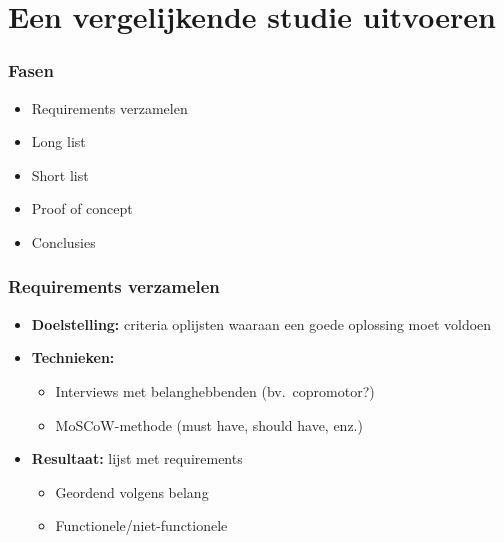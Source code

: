 \documentclass[aspectratio=169]{beamer}
\begin{document}
\section{Een vergelijkende studie uitvoeren}

\begin{frame}
  \frametitle{Fasen}


  \begin{itemize}
    \item Requirements verzamelen
    \item Long list
    \item Short list
    \item Proof of concept
    \item Conclusies
  \end{itemize}

\end{frame}

\begin{frame}
  \frametitle{Requirements verzamelen}

  \begin{itemize}
    \item \textbf{Doelstelling:} criteria oplijsten waaraan een goede oplossing moet voldoen
    \item \textbf{Technieken:}
          \begin{itemize}
            \item Interviews met belanghebbenden (bv.\ copromotor?)
            \item MoSCoW-methode (must have, should have, enz.)
          \end{itemize}
    \item \textbf{Resultaat:} lijst met requirements
          \begin{itemize}
            \item Geordend volgens belang
            \item Functionele/niet-functionele
          \end{itemize}
  \end{itemize}

\end{frame}
\end{document}
